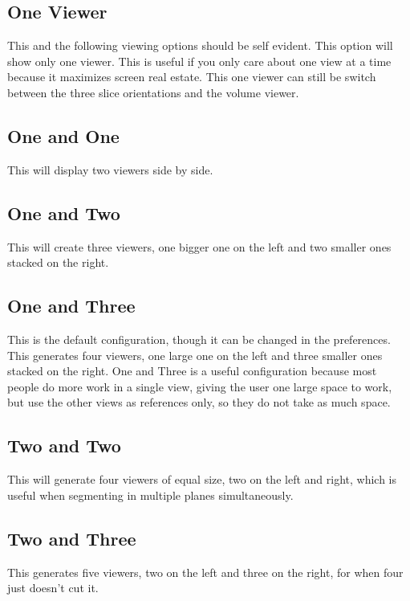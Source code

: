 \documentclass[fleqn,11pt,openany]{book}
\begin{document}
\subsection{One Viewer}

This and the following viewing options should be self evident.
This option will show only one viewer.
This is useful if you only care about one view at a time because it maximizes screen real estate.
This one viewer can still be switch between the three slice orientations and the volume viewer.  

\subsection{One and One}

This will display two viewers side by side.  

\subsection{One and Two}

This will create three viewers,  one bigger one on the left and two smaller ones stacked on the right.  

\subsection{One and Three}

This is the default configuration,  though it can be changed in the preferences.
This generates four viewers, one large one on the left and three smaller ones stacked on the right.
One and Three is a useful configuration because most people do more work in a single view, giving the user one large space to work, but use the other views as references only, so they do not take as much space.

\subsection{Two and Two}

This will generate four viewers of equal size, two on the left and right, which
is useful when segmenting in multiple planes simultaneously.

\subsection{Two and Three}

This generates five viewers, two on the left and three on the right, for when four just doesn't cut it.  
\end{document}
